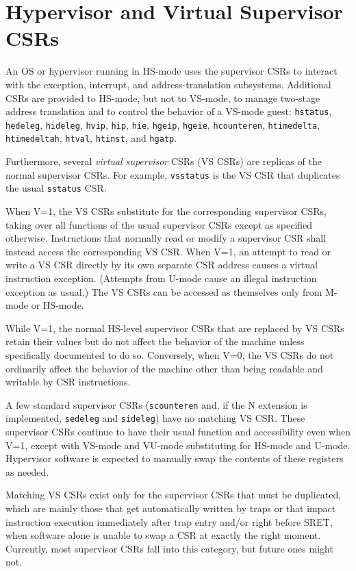 \section{Hypervisor and Virtual Supervisor CSRs}

An OS or hypervisor running in HS-mode uses the supervisor CSRs to interact with the exception,
interrupt, and address-translation subsystems.
Additional CSRs are provided to HS-mode, but not to VS-mode, to manage
two-stage address translation and to control the behavior of a VS-mode guest:
{\tt hstatus}, {\tt hedeleg}, {\tt hideleg}, {\tt hvip}, {\tt hip}, {\tt hie},
{\tt hgeip}, {\tt hgeie},
{\tt hcounteren}, {\tt htimedelta}, {\tt htimedeltah}, {\tt htval},
{\tt htinst}, and {\tt hgatp}.

Furthermore, several {\em virtual supervisor} CSRs (VS CSRs) are replicas
of the normal supervisor CSRs.
For example, {\tt vsstatus} is the VS CSR that duplicates the usual
{\tt sstatus} CSR.

When V=1, the VS CSRs substitute for the corresponding supervisor CSRs,
taking over all functions of the usual supervisor CSRs except as specified
otherwise.
Instructions that normally read or modify a supervisor CSR shall instead
access the corresponding VS CSR.
When V=1, an attempt to read or write a VS CSR directly by its own
separate CSR address causes a virtual instruction exception.
(Attempts from U-mode cause an illegal instruction exception as usual.)
The VS CSRs can be accessed as themselves only from M-mode or HS-mode.

While V=1, the normal HS-level supervisor CSRs that are replaced by
VS CSRs retain their values but do
not affect the behavior of the machine unless specifically documented to
do so.
Conversely, when V=0, the VS CSRs do not ordinarily affect the behavior of
the machine other than being readable and writable by CSR instructions.

A few standard supervisor CSRs ({\tt scounteren} and, if the N extension
is implemented, {\tt sedeleg} and {\tt sideleg}) have no matching VS CSR.
These supervisor CSRs continue to have their usual function and
accessibility even when V=1, except with VS-mode and VU-mode substituting for
HS-mode and U-mode.
Hypervisor software is expected to manually swap the contents of these
registers as needed.

\begin{commentary}
Matching VS CSRs exist only for the supervisor CSRs that must be
duplicated, which are mainly those that get automatically written by
traps or that impact instruction execution immediately after trap entry
and/or right before SRET, when software alone is unable to swap a CSR at
exactly the right moment.
Currently, most supervisor CSRs fall into this category, but future ones
might not.
\end{commentary}

